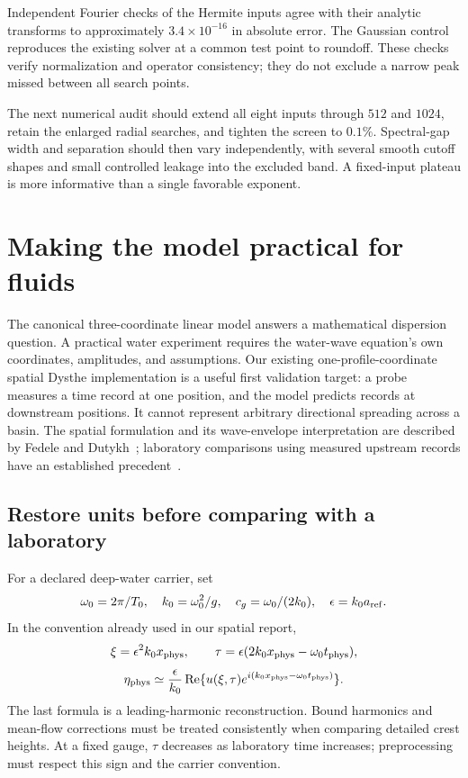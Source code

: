 \documentclass[10pt]{article}
\begin{document}
Independent Fourier checks of the Hermite inputs agree with their analytic transforms to approximately $3.4\times10^{-16}$ in absolute error. The Gaussian control reproduces the existing solver at a common test point to roundoff. These checks verify normalization and operator consistency; they do not exclude a narrow peak missed between all search points.

The next numerical audit should extend all eight inputs through $512$ and $1024$, retain the enlarged radial searches, and tighten the screen to $0.1\%$. Spectral-gap width and separation should then vary independently, with several smooth cutoff shapes and small controlled leakage into the excluded band. A fixed-input plateau is more informative than a single favorable exponent.

\newpage
\section{Making the model practical for fluids}
The canonical three-coordinate linear model answers a mathematical dispersion question. A practical water experiment requires the water-wave equation's own coordinates, amplitudes, and assumptions. Our existing one-profile-coordinate spatial Dysthe implementation is a useful first validation target: a probe measures a time record at one position, and the model predicts records at downstream positions. It cannot represent arbitrary directional spreading across a basin. The spatial formulation and its wave-envelope interpretation are described by Fedele and Dutykh~\cite{FD}; laboratory comparisons using measured upstream records have an established precedent~\cite{Shemer}.

\subsection{Restore units before comparing with a laboratory}
For a declared deep-water carrier, set
\[
 \omega_0=2\pi/T_0,\quad k_0=\omega_0^2/g,\quad
 c_g=\omega_0/(2k_0),\quad \epsilon=k_0a_{\rm ref}.
\]
In the convention already used in our spatial report,
\[
 \xi=\epsilon^2 k_0x_{\rm phys},\qquad
 \tau=\epsilon(2k_0x_{\rm phys}-\omega_0t_{\rm phys}),
\]
\[
 \eta_{\rm phys}\simeq\frac{\epsilon}{k_0}
 \operatorname{Re}\{u(\xi,\tau)e^{i(k_0x_{\rm phys}-\omega_0t_{\rm phys})}\}.
\]
The last formula is a leading-harmonic reconstruction. Bound harmonics and mean-flow corrections must be treated consistently when comparing detailed crest heights. At a fixed gauge, $\tau$ decreases as laboratory time increases; preprocessing must respect this sign and the carrier convention.
\end{document}
